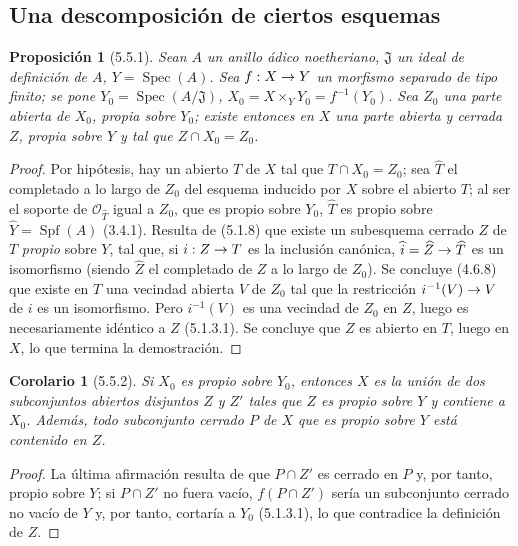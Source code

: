 \documentclass[10pt,oneside,openany]{book}
\theoremstyle{egaenv}\newtheorem*{env}{---}
\theoremstyle{egastatement}
\newtheorem*{proposition}{Proposición}
\newtheorem*{corollary}{Corolario}
\theoremstyle{egadescription}
\renewcommand{\to}{\mathchoice{\longrightarrow}{\rightarrow}{\rightarrow}{\rightarrow}}
\begin{document}
\subsection{Una descomposición de ciertos esquemas}
\label{subsection:III.5.5}
\label{subsection:III.5.5-fr}

\begin{proposition}[5.5.1]
\label{III.5.5.1-fr}
Sean $A$ un anillo ádico noetheriano, $\mathfrak J$ un ideal de definición
de $A$, $Y=\operatorname{Spec}(A)$. Sea $f:X\to Y$ un morfismo separado de
tipo finito; se pone $Y_0=\operatorname{Spec}(A/\mathfrak J)$,
$X_0=X\times_Y Y_0=f^{-1}(Y_0)$. Sea $Z_0$ una parte abierta de $X_0$,
propia sobre $Y_0$; existe entonces en $X$ una parte abierta y cerrada $Z$,
propia sobre $Y$ y tal que $Z\cap X_0=Z_0$.
\end{proposition}

\begin{proof}
Por hipótesis, hay un abierto $T$ de $X$ tal que $T\cap X_0=Z_0$; sea
$\widehat T$ el completado a lo largo de $Z_0$ del esquema inducido por $X$ sobre
el abierto $T$; al ser el soporte de $\mathcal O_{\widehat T}$ igual a $Z_0$, que es
propio sobre $Y_0$, $\widehat T$ es propio sobre
$\widehat Y=\operatorname{Spf}(A)$ (3.4.1). Resulta de (5.1.8) que existe
un subesquema cerrado $Z$ de $T$ \emph{propio} sobre $Y$, tal que, si $i:Z\to T$ es
la inclusión canónica, $\widehat i=\widehat Z\to\widehat T$ es un
isomorfismo (siendo $\widehat Z$ el completado de $Z$ a lo largo de $Z_0$). Se
concluye (4.6.8) que existe en $T$ una vecindad abierta $V$ de $Z_0$ tal que
la restricción $i^{-1}(V)\to V$ de $i$ es un isomorfismo. Pero
$i^{-1}(V)$ es una vecindad de $Z_0$ en $Z$, luego es necesariamente
idéntico a $Z$ (5.1.3.1). Se concluye que $Z$ es abierto en $T$, luego
en $X$, lo que termina la demostración.
\end{proof}

\begin{corollary}[5.5.2]
\label{III.5.5.2}
\label{III.5.5.2-fr}
Si $X_0$ es propio sobre $Y_0$, entonces $X$ es la unión de dos
subconjuntos abiertos disjuntos $Z$ y $Z'$ tales que $Z$ es propio sobre
$Y$ y contiene a $X_0$. Además, todo subconjunto cerrado $P$ de $X$
que es propio sobre $Y$ está contenido en $Z$.
\end{corollary}

\begin{proof}
La última afirmación resulta de que $P\cap Z'$ es cerrado en $P$ y, por tanto, propio
sobre $Y$; si $P\cap Z'$ no fuera vacío, $f(P\cap Z')$ sería un subconjunto cerrado
no vacío de $Y$ y, por tanto, cortaría a $Y_0$ (5.1.3.1), lo que contradice la
definición de $Z$.
\end{proof}
\end{document}

